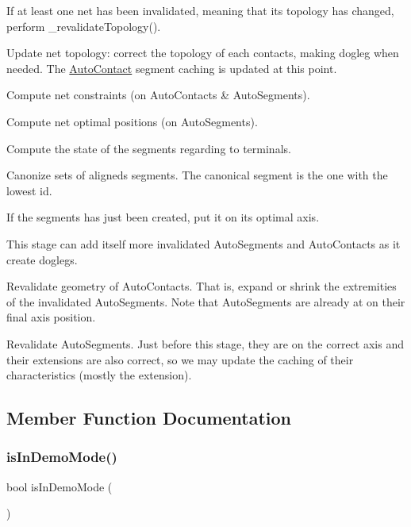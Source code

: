 \begin{DoxyItemize}
\item If at least one net has been invalidated, meaning that it\textquotesingle{}s topology has changed, perform {\ttfamily \+\_\+revalidate\+Topology()}. 
\begin{DoxyItemize}
\item Update net topology\+: correct the topology of each contacts, making dogleg when needed. The \mbox{\hyperlink{classKatabatic_1_1AutoContact}{Auto\+Contact}} segment caching is updated at this point. 
\item Compute net constraints (on Auto\+Contacts \& Auto\+Segments). 
\item Compute net optimal positions (on Auto\+Segments). 
\item Compute the state of the segments regarding to terminals. 
\item Canonize sets of aligneds segments. The canonical segment is the one with the lowest {\ttfamily id}. 
\item If the segments has just been created, put it on its optimal axis. 
\end{DoxyItemize}This stage can add itself more invalidated Auto\+Segments and Auto\+Contacts as it create doglegs.


\item Revalidate geometry of Auto\+Contacts. That is, expand or shrink the extremities of the invalidated Auto\+Segments. Note that Auto\+Segments are already at on their final axis position.


\item Revalidate Auto\+Segments. Just before this stage, they are on the correct axis and their extensions are also correct, so we may update the caching of their characteristics (mostly the extension). 
\end{DoxyItemize}

\subsection{Member Function Documentation}
\mbox{\label{classKatabatic_1_1Session_a037c7ec3b18ec43973f2e6fe3a172000}} 
\subsubsection{\texorpdfstring{is\+In\+Demo\+Mode()}{isInDemoMode()}}
{\footnotesize\ttfamily bool is\+In\+Demo\+Mode (\begin{DoxyParamCaption}{ }\end{DoxyParamCaption})\hspace{0.3cm}{\ttfamily [static]}}

